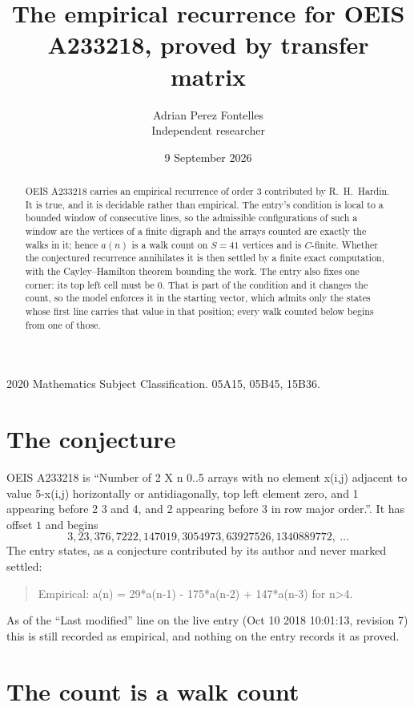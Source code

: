 \documentclass[11pt,a4paper]{article}
\title{The empirical recurrence for OEIS A233218, proved by transfer matrix}
\author{Adrian Perez Fontelles\\ \small Independent researcher}
\date{9 September 2026}
\theoremstyle{plain}
\theoremstyle{definition}
\begin{document}
\maketitle

\begin{abstract}
OEIS A233218 carries an empirical recurrence of order $3$ contributed by R.~H.~Hardin. It is
true, and it is decidable rather than empirical. The entry's condition is local to a bounded window of consecutive lines, so
the admissible configurations of such a window are the vertices of a finite digraph and the
arrays counted are exactly the walks in it; hence $a(n)$ is a walk count on $S=41$ vertices
and is $C$-finite. Whether the conjectured recurrence annihilates it is then settled by a
finite exact computation, with the Cayley--Hamilton theorem bounding the work.
 The entry also fixes one corner: its top left cell must be $0$. That is part of the condition and it changes the count, so the model enforces it in the starting vector, which admits only the states whose first line carries that value in that position; every walk counted below begins from one of those.\end{abstract}

\noindent\small 2020 Mathematics Subject Classification. 05A15, 05B45, 15B36.\normalsize

\section{The conjecture}

OEIS A233218 is ``Number of 2 X n 0..5 arrays with no element x(i,j) adjacent to value 5-x(i,j) horizontally or antidiagonally, top left element zero, and 1 appearing before 2 3 and 4, and 2 appearing before 3 in row major order.''. It has offset $1$ and begins
\[
3, 23, 376, 7222, 147019, 3054973, 63927526, 1340889772,\ \dots
\]
The entry states, as a conjecture contributed by its author and never marked settled:
\begin{quote}
Empirical: a(n) = 29*a(n-1) - 175*a(n-2) + 147*a(n-3) for n>4.
\end{quote}
As of the ``Last modified'' line on the live entry (Oct 10 2018 10:01:13, revision 7) this is still
recorded as empirical, and nothing on the entry records it as proved.

\section{The count is a walk count}
\end{document}
